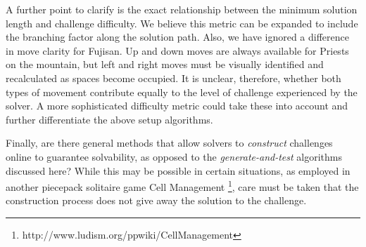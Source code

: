 \documentclass[journal]{IEEEtran}
\begin{document}

A further point to clarify is the exact relationship between the minimum solution length and challenge difficulty. We believe this metric can be expanded to include the branching factor along the solution path. Also, we have ignored a difference in move clarity for Fujisan. Up and down moves are always available for Priests on the mountain, but left and right moves must be visually identified and recalculated as spaces become occupied. It is unclear, therefore, whether both types of movement contribute equally to the level of challenge experienced by the solver. A more sophisticated difficulty metric could take these into account and further differentiate the above setup algorithms.

Finally, are there general methods that allow solvers to {\it construct} challenges online to guarantee solvability, as opposed to the {\it generate-and-test} algorithms discussed here? While this may be possible in certain situations, as employed in another piecepack solitaire game Cell Management \footnote{http://www.ludism.org/ppwiki/CellManagement}, care must be taken that the construction process does not give away the solution to the challenge.






%
%
\end{document}
